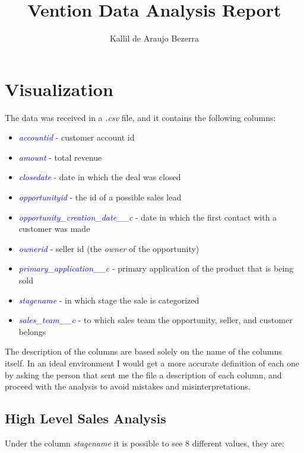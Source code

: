 \documentclass[]{report}
\title{Vention Data Analysis Report}
\author{Kallil de Araujo Bezerra}
\begin{document}
\maketitle


\tableofcontents

\chapter{Visualization}

The data was received in a \textit{.csv} file, and it contains the following columns:

\begin{itemize}
	\item \textcolor{blue}{\textit{accountid}} - customer account id
	\item \textcolor{blue}{\textit{amount}} - total revenue
	\item \textcolor{blue}{\textit{closedate}} - date in which the deal was closed
	\item \textcolor{blue}{\textit{opportunityid}} - the id of a possible sales lead
	\item \textcolor{blue}{\textit{opportunity\_creation\_date\_\_c}} - date in which the first contact with a customer was made
	\item \textcolor{blue}{\textit{ownerid}} - seller id (the \textit{owner} of the opportunity)
	\item \textcolor{blue}{\textit{primary\_application\_\_c}} - primary application of the product that is being sold
	\item \textcolor{blue}{\textit{stagename}} - in which stage the sale is categorized
	\item \textcolor{blue}{\textit{sales\_team\_\_c}} - to which sales team the opportunity, seller, and customer belongs
\end{itemize}

The description of the columns are based solely on the name of the columns itself. In an ideal environment I would get a more accurate definition of each one by asking the person that sent me the file a description of each column, and proceed with the analysis to avoid mistakes and misinterpretations.

\section{High Level Sales Analysis}

Under the column \textit{stagename} it is possible to see 8 different values, they are:
\end{document}
